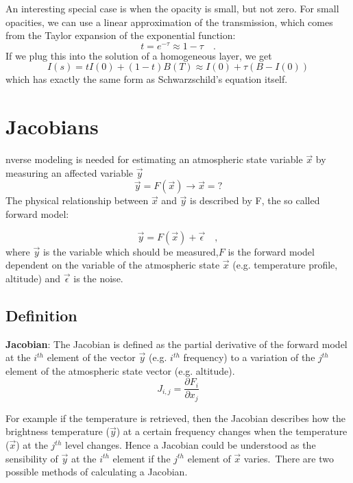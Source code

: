 An interesting special case is when the opacity is small, but not zero. For small opacities, 
we can use a linear approximation of the transmission, which comes from the Taylor expansion
of the exponential function:
\begin{equation}
	t = e^{-\tau} \approx 1 - \tau \quad .
\end{equation}
If we plug this into the solution of a homogeneous layer, we get
\begin{equation}
	I(s) = t I(0)  + \left( 1-t \right) B(T) \approx I(0) + \tau \left( B - I(0)\right)
\end{equation}
which has exactly the same form as Schwarzschild's equation itself.

\section{Jacobians}
 nverse modeling is needed for estimating an atmospheric state variable
$\vec{x}$ by measuring an affected variable $\vec{y}$
\begin{equation*}
\vec{y}=F(\vec{x}) \rightarrow \vec{x}=?
\end{equation*}
The physical relationship between $\vec{x}$ and $\vec{y}$ is described by F, the
so called forward model:

\begin{equation*}
\vec{y}=F(\vec{x})+\vec{\epsilon} \quad ,
\end{equation*}
where $\vec{y}$ is the variable which should be measured,$F$ is the forward
model dependent on the variable of the atmospheric state $\vec{x}$ (e.g.
temperature profile, altitude)  and $\vec{\epsilon}$ is the noise.\\

\subsection*{Definition}
\textbf{Jacobian}:
The Jacobian is defined as the partial derivative of the forward model at the
$i^{th}$ element of the vector $\vec{y}$ (e.g. $i^{th}$ frequency) to a
variation of the $j^{th}$ element of the atmospheric state vector (e.g.
altitude).
\begin{equation*}
J_{i,j}=\frac{\partial F_i}{\partial x_j}
\end{equation*}

For example if the temperature is retrieved, then the Jacobian describes how
the brightness temperature ($\vec{y}$) at a certain frequency changes when the
temperature ($\vec{x}$) at the $j^{th}$ level changes.
Hence a Jacobian could be understood as the sensibility of $\vec{y}$ at the
$i^{th}$ element if the $j^{th}$ element of $\vec{x}$ varies.\
There are two possible methods of calculating a Jacobian.

